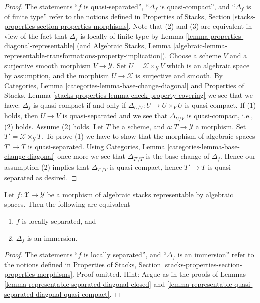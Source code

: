 \begin{proof}
The statements
``$f$ is quasi-separated'',
``$\Delta_f$ is quasi-compact'', and
``$\Delta_f$ is of finite type''
refer to the notions defined in
Properties of Stacks,
Section \ref{stacks-properties-section-properties-morphisms}.
Note that (2) and (3) are equivalent in view of the fact that
$\Delta_f$ is locally of finite type by
Lemma \ref{lemma-properties-diagonal-representable}
(and
Algebraic Stacks, Lemma
\ref{algebraic-lemma-representable-transformations-property-implication}).
Choose a scheme $V$ and a surjective smooth morphism $V \to \mathcal{Y}$.
Set $U = \mathcal{X} \times_\mathcal{Y} V$ which is an algebraic
space by assumption, and the morphism $U \to \mathcal{X}$ is surjective
and smooth. By
Categories, Lemma \ref{categories-lemma-base-change-diagonal}
and
Properties of Stacks,
Lemma \ref{stacks-properties-lemma-check-property-covering}
we see that we have: $\Delta_f$ is quasi-compact if and only if
$\Delta_{U/V} : U \to  U \times_V U$ is quasi-compact.
If (1) holds, then $U \to V$ is quasi-separated and we see that
$\Delta_{U/V}$ is quasi-compact, i.e., (2) holds.
Assume (2) holds. Let $T$ be a scheme, and $a : T \to \mathcal{Y}$
a morphism. Set $T' = \mathcal{X} \times_\mathcal{Y} T$. To prove
(1) we have to show that the morphism of algebraic spaces $T' \to T$
is quasi-separated. Using
Categories, Lemma \ref{categories-lemma-base-change-diagonal}
once more we see that $\Delta_{T'/T}$ is the base change of
$\Delta_f$. Hence our assumption (2) implies that $\Delta_{T'/T}$
is quasi-compact, hence $T' \to T$ is quasi-separated as desired.
\end{proof}

\begin{lemma}
\label{lemma-representable-locally-separated-diagonal-immersion}
Let $f : \mathcal{X} \to \mathcal{Y}$ be a morphism of algebraic stacks
representable by algebraic spaces. Then the following are equivalent
\begin{enumerate}
\item $f$ is locally separated, and
\item $\Delta_f$ is an immersion.
\end{enumerate}
\end{lemma}

\begin{proof}
The statements ``$f$ is locally separated'', and ``$\Delta_f$ is an immersion''
refer to the notions defined in
Properties of Stacks,
Section \ref{stacks-properties-section-properties-morphisms}.
Proof omitted. Hint: Argue as in the proofs of
Lemmas \ref{lemma-representable-separated-diagonal-closed} and
\ref{lemma-representable-quasi-separated-diagonal-quasi-compact}.
\end{proof}







